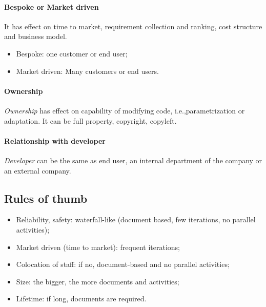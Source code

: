 \paragraph{Bespoke or Market driven}
It has effect on time to market, requirement collection and ranking, cost structure and business model.
\begin{itemize}
\item Bespoke: one customer or end user;
\item Market driven: Many customers or end users.
\end{itemize}

\paragraph{Ownership}
\emph{Ownership} has effect on capability of modifying code, i.e.,\@ parametrization or adaptation. It can be full property, copyright, copyleft.

\paragraph{Relationship with developer}
\emph{Developer} can be the same as end user, an internal department of the company or an external company.

\subsection{Rules of thumb}
\begin{itemize}
\item Reliability, safety: waterfall-like (document based, few iterations, no parallel activities);
\item Market driven (time to market): frequent iterations;
\item Colocation of staff: if no, document-based and no parallel activities;
\item Size: the bigger, the more documents and activities;
\item Lifetime: if long, documents are required.
\end{itemize}
